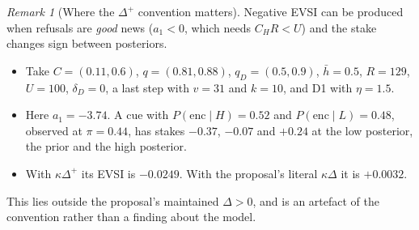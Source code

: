 \documentclass[11pt,a4paper]{article}
\theoremstyle{definition}
\theoremstyle{remark}
\newtheorem{remark}[theorem]{Remark}
\begin{document}
\begin{remark}[Where the $\Delta^+$ convention matters]
Negative EVSI can be produced when refusals are \emph{good} news ($a_1<0$, which needs $C_HR<U$) and the stake changes sign between posteriors.
\begin{itemize}[nosep]
\item Take $C=(0.11,0.6)$, $q=(0.81,0.88)$, $q_D=(0.5,0.9)$, $\bar h=0.5$, $R=129$, $U=100$, $\delta_D=0$, a last step with $v=31$ and $k=10$, and D1 with $\eta=1.5$.
\item Here $a_1=-3.74$. A cue with $P(\text{enc}\mid H)=0.52$ and $P(\text{enc}\mid L)=0.48$, observed at $\pi=0.44$, has stakes $-0.37$, $-0.07$ and $+0.24$ at the low posterior, the prior and the high posterior.
\item With $\kappa\Delta^+$ its EVSI is $-0.0249$. With the proposal's literal $\kappa\Delta$ it is $+0.0032$.
\end{itemize}
This lies outside the proposal's maintained $\Delta>0$, and is an artefact of the convention rather than a finding about the model.
\end{remark}
\end{document}
